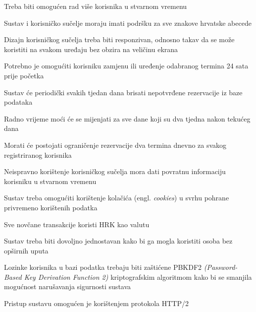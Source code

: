 \begin{packed_item}
	\item Treba biti omogućen rad više korisnika u stvarnom vremenu
	\item Sustav i korisničko sučelje moraju imati podršku za sve znakove hrvatske abecede
	\item Dizajn korisničkog sučelja treba biti responzivan, odnosno takav da se može koristiti na svakom uređaju bez obzira na veličinu ekrana
	\item Potrebno je omogućiti korisniku zamjenu ili uređenje odabranog termina 24 sata prije početka
	\item Sustav će periodički svakih tjedan dana brisati nepotvrđene rezervacije iz baze podataka
	\item Radno vrijeme moći će se mijenjati za sve dane koji su dva tjedna nakon tekućeg dana
	\item Morati će postojati ograničenje rezervacije dva termina dnevno za svakog registriranog korisnika
	\item Neispravno korištenje korisničkog sučelja mora dati povratnu informaciju korisniku u stvarnom vremenu
	\item Sustav treba omogućiti korištenje kolačića (engl. \textit{cookies}) u svrhu pohrane privremeno korištenih podatka
	\item Sve novčane transakcije koristi HRK kao valutu
	\item Sustav treba biti dovoljno jednostavan kako bi ga mogla koristiti osoba bez opširnih uputa
	\item Lozinke korisnika u bazi podatka trebaju biti zaštićene PBKDF2 \textit{(Password-Based Key Derivation Function 2)}
kriptografskim algoritmom kako bi se smanjila mogućnost narušavanja sigurnosti sustava
	\item Pristup sustavu omogućen je korištenjem protokola HTTP/2
	
\end{packed_item}


